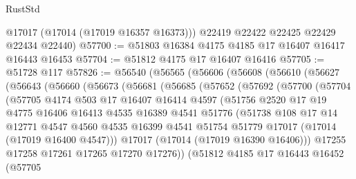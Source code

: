 \begin{lexlean}{RustStd}
\begin{coremodule}
        @17017
        (@17014 (@17019 @16357 @16373)))
      @22419
      @22422
      @22425
      @22429
      @22434
      @22440)
@57700 := @51803 @16384 @4175 @4185 @17 @16407 @16417 @16443 @16453
@57704 := @51812 @4175 @17 @16407 @16416
@57705 := @51728 @117
@57826 := @56540
    (@56565
      (@56606
        (@56608
          (@56610
            (@56627
              (@56643
                (@56660
                  (@56673
                    (@56681
                      (@56685
                        (@57652
                          (@57692
                            (@57700
                              (@57704
                                (@57705
                                  @4174
                                  @503
                                  @17
                                  @16407
                                  @16414
                                  @4597
                                  (@51756
                                    @2520
                                    @17
                                    @19
                                    @4775
                                    @16406
                                    @16413
                                    @4535
                                    @16389
                                    @4541
                                    @51776
                                    (@51738
                                      @108
                                      @17
                                      @14
                                      @12771
                                      @4547
                                      @4560
                                      @4535
                                      @16399
                                      @4541
                                      @51754
                                      @51779
                                      @17017
                                      (@17014 (@17019 @16400 @4547)))
                                    @17017
                                    (@17014 (@17019 @16390 @16406)))
                                  @17255
                                  @17258
                                  @17261
                                  @17265
                                  @17270
                                  @17276))
                              (@51812
                                @4185
                                @17
                                @16443
                                @16452
                                (@57705

\end{coremodule}
\end{lexlean}
